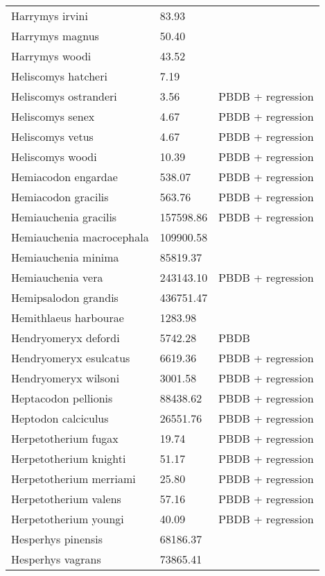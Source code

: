 \begin{center}
\begin{longtable}{p{} p{} p{} }
  Harrymys irvini & 83.93 & \cite{Tomiya2013} \\ 
  Harrymys magnus & 50.40 & \cite{Tomiya2013} \\ 
  Harrymys woodi & 43.52 & \cite{Kirk2011} \\ 
  Heliscomys hatcheri & 7.19 & \cite{Wilson2012} \\ 
  Heliscomys ostranderi & 3.56 & PBDB + regression \\ 
  Heliscomys senex & 4.67 & PBDB + regression \\ 
  Heliscomys vetus & 4.67 & PBDB + regression \\ 
  Heliscomys woodi & 10.39 & PBDB + regression \\ 
  Hemiacodon engardae & 538.07 & PBDB + regression \\ 
  Hemiacodon gracilis & 563.76 & PBDB + regression \\ 
  Hemiauchenia gracilis & 157598.86 & PBDB + regression \\ 
  Hemiauchenia macrocephala & 109900.58 & \cite{Smith2004} \\ 
  Hemiauchenia minima & 85819.37 & \cite{Tomiya2013} \\ 
  Hemiauchenia vera & 243143.10 & PBDB + regression \\ 
  Hemipsalodon grandis & 436751.47 & \cite{Scott1937} \\ 
  Hemithlaeus harbourae & 1283.98 & \cite{Loomis1932} \\ 
  Hendryomeryx defordi & 5742.28 & PBDB \\ 
  Hendryomeryx esulcatus & 6619.36 & PBDB + regression \\ 
  Hendryomeryx wilsoni & 3001.58 & PBDB + regression \\ 
  Heptacodon pellionis & 88438.62 & PBDB + regression \\ 
  Heptodon calciculus & 26551.76 & PBDB + regression \\ 
  Herpetotherium fugax & 19.74 & PBDB + regression \\ 
  Herpetotherium knighti & 51.17 & PBDB + regression \\ 
  Herpetotherium merriami & 25.80 & PBDB + regression \\ 
  Herpetotherium valens & 57.16 & PBDB + regression \\ 
  Herpetotherium youngi & 40.09 & PBDB + regression \\ 
  Hesperhys pinensis & 68186.37 & \cite{Tomiya2013} \\ 
  Hesperhys vagrans & 73865.41 & \cite{Tomiya2013} \\ 

\end{longtable}
\end{center}
